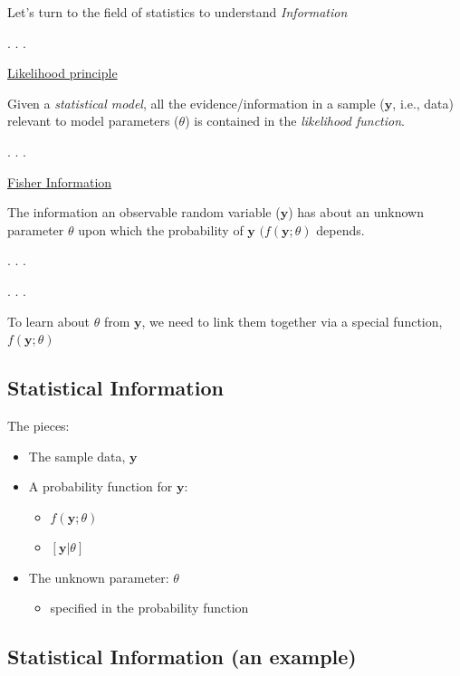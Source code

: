 \documentclass[
  letterpaper,
  DIV=11,
  numbers=noendperiod]{scrartcl}
\providecommand{\tightlist}{%
  \setlength{\itemsep}{0pt}\setlength{\parskip}{0pt}}\usepackage{longtable,booktabs,array}
\begin{document}
Let's turn to the field of statistics to understand \emph{Information}

. . .

\href{https://en.wikipedia.org/wiki/Likelihood_principle}{Likelihood
principle}

Given a \emph{statistical model}, all the evidence/information in a
sample (\(\textbf{y}\), i.e., data) relevant to model parameters
(\(\theta\)) is contained in the \emph{likelihood function}.

. . .

\href{https://en.wikipedia.org/wiki/Fisher_information}{Fisher
Information}

The information an observable random variable (\(\textbf{y}\)) has about
an unknown parameter \(\theta\) upon which the probability of
\(\textbf{y}\) \((f(\textbf{y};\theta)\) depends.

. . .

. . .

To learn about \(\theta\) from \(\textbf{y}\), we need to link them
together via a special function, \(f(\textbf{y};\theta)\)

\hypertarget{statistical-information-1}{%
\subsection{Statistical Information}\label{statistical-information-1}}

The pieces:

\begin{itemize}
\item
  The sample data, \(\textbf{y}\)
\item
  A probability function for \(\textbf{y}\):

  \begin{itemize}
  \item
    \(f(\textbf{y};\theta)\)
  \item
    \([\textbf{y}|\theta]\)
  \end{itemize}
\item
  The unknown parameter: \(\theta\)

  \begin{itemize}
  \tightlist
  \item
    specified in the probability function
  \end{itemize}
\end{itemize}

\hypertarget{statistical-information-an-example}{%
\subsection{Statistical Information (an
example)}\label{statistical-information-an-example}}
\end{document}
